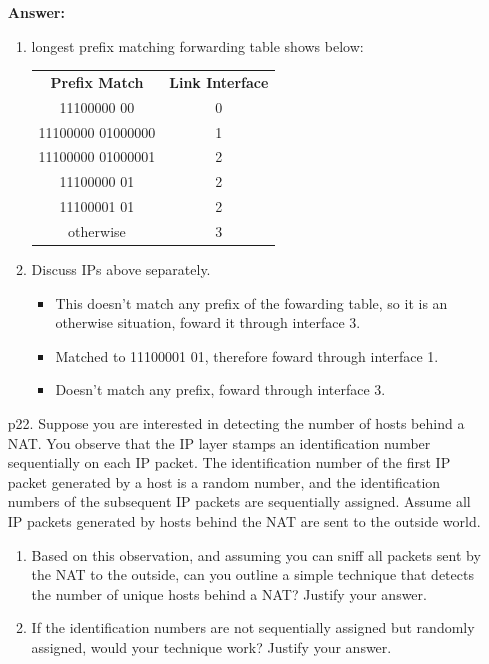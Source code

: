 \begin{enumerate}
    \textbf{Answer:}

    \begin{enumerate}
        \item longest prefix matching forwarding table shows below:
        \begin{table}[H]
            \centering
            \begin{tabular}{cc}
            \textbf{Prefix Match} & \textbf{Link Interface} \\
            11100000 00 & 0 \\
            11100000 01000000 & 1 \\
            11100000 01000001 & 2 \\
            11100000 01 & 2 \\
            11100001 01 & 2 \\
            otherwise & 3 \\
            \end{tabular}
            \label{tab:forwarding_table}
        \end{table}

        \item Discuss IPs above separately.
        \begin{itemize}
            \item This doesn't match any prefix of the fowarding table, so it is an otherwise situation, foward it through interface 3.
            \item Matched to 11100001 01, therefore foward through interface 1.
            \item Doesn't match any prefix, foward through interface 3.
        \end{itemize} 
    \end{enumerate}

    \item[p22.] Suppose you are interested in detecting the number of hosts behind a NAT. You observe that the IP layer stamps an identification number sequentially on each IP packet. The identification number of the first IP packet generated by a host is a random number, and the identification numbers of the subsequent IP packets are sequentially assigned. Assume all IP packets generated by hosts behind the NAT are sent to the outside world.
    \begin{enumerate}
        \item Based on this observation, and assuming you can sniff all packets sent by the NAT to the outside, can you outline a simple technique that detects the number of unique hosts behind a NAT? Justify your answer.
        \item If the identification numbers are not sequentially assigned but randomly assigned, would your technique work? Justify your answer.
    \end{enumerate}


\end{enumerate}
